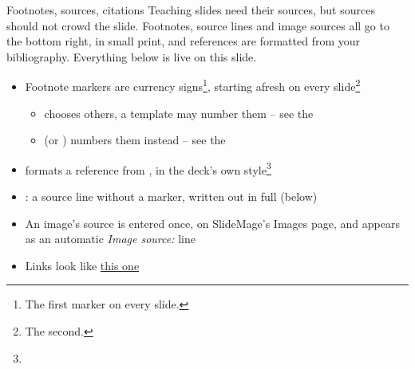 
\begin{standardframe}{Footnotes, sources, citations}
	\small
	Teaching slides need their sources, but sources should not crowd the slide.
	Footnotes, source lines and image sources all go to the bottom right, in
	small print, and references are formatted from your bibliography. Everything
	below is live on this slide.
	\par\medskip
	\begin{itemize}
		\item Footnote markers are currency signs\footnote{The first marker on every slide.}, starting afresh on every slide\footnote{The second.}
		\begin{itemize}
			\item {} chooses others, a template may number them -- see the 
			\item {} (or ) numbers them instead -- see the 
		\end{itemize}
		\item {} formats a reference from , in the deck's own style\footnote{}
		\item {}: a source line without a marker, written out in full (below)
		\item An image's source is entered once, on SlideMage's Images page, and appears as an automatic \emph{Image source:} line
		\item Links look like \href{https://ctan.org/pkg/beamer}{this one}
	\end{itemize}
\end{standardframe}
